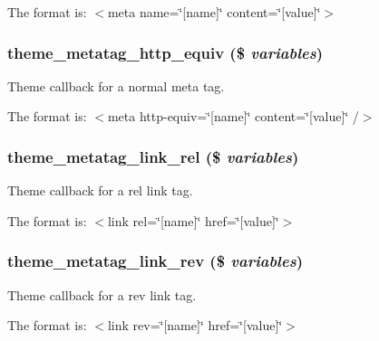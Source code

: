 The format is: $<$meta name=\char`\"{}\mbox{[}name\mbox{]}\char`\"{} content=\char`\"{}\mbox{[}value\mbox{]}\char`\"{}$>$ \hypertarget{metatag_8theme_8inc_a527af0807d455a67255c1057b2b12ccf}{
\subsubsection[{theme\_\-metatag\_\-http\_\-equiv}]{\setlength{\rightskip}{0pt plus 5cm}theme\_\-metatag\_\-http\_\-equiv (\$ {\em variables})}}
\label{metatag_8theme_8inc_a527af0807d455a67255c1057b2b12ccf}
Theme callback for a normal meta tag.

The format is: $<$meta http-\/equiv=\char`\"{}\mbox{[}name\mbox{]}\char`\"{} content=\char`\"{}\mbox{[}value\mbox{]}\char`\"{} /$>$ \hypertarget{metatag_8theme_8inc_a48c5683c8727cf29f68773207111ca71}{
\subsubsection[{theme\_\-metatag\_\-link\_\-rel}]{\setlength{\rightskip}{0pt plus 5cm}theme\_\-metatag\_\-link\_\-rel (\$ {\em variables})}}
\label{metatag_8theme_8inc_a48c5683c8727cf29f68773207111ca71}
Theme callback for a rel link tag.

The format is: $<$link rel=\char`\"{}\mbox{[}name\mbox{]}\char`\"{} href=\char`\"{}\mbox{[}value\mbox{]}\char`\"{}$>$ \hypertarget{metatag_8theme_8inc_adc3d79e746ab41a9b446014a250f388f}{
\subsubsection[{theme\_\-metatag\_\-link\_\-rev}]{\setlength{\rightskip}{0pt plus 5cm}theme\_\-metatag\_\-link\_\-rev (\$ {\em variables})}}
\label{metatag_8theme_8inc_adc3d79e746ab41a9b446014a250f388f}
Theme callback for a rev link tag.

The format is: $<$link rev=\char`\"{}\mbox{[}name\mbox{]}\char`\"{} href=\char`\"{}\mbox{[}value\mbox{]}\char`\"{}$>$ 